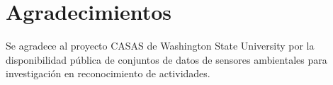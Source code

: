 
\section{Agradecimientos}

Se agradece al proyecto CASAS de Washington State University por la
disponibilidad pública de conjuntos de datos de sensores ambientales para
investigación en reconocimiento de actividades.

